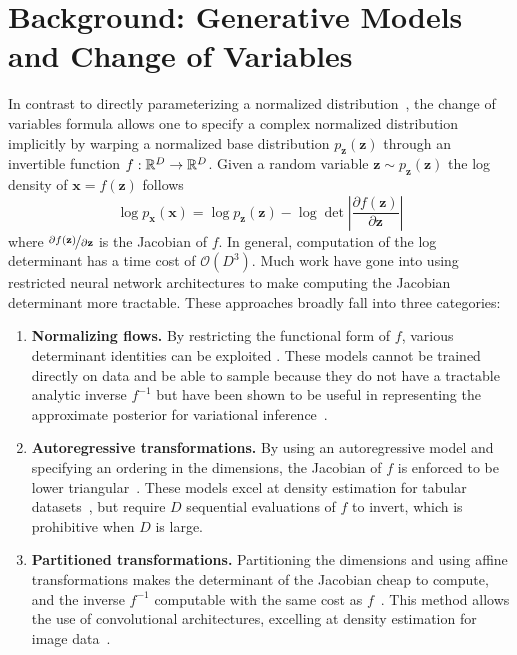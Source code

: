 \documentclass{article} %
\newcommand{\z}{\mathbf{z}}
\newcommand{\x}{\mathbf{x}}
\newcommand\0{\kern-1.2pt\vec{\kern1.2pt 0}}
\newcommand{\bigO}{\mathcal{O}}
\begin{document}
\section{Background: Generative Models and Change of Variables}\label{sec:cov_models}
In contrast to directly parameterizing a normalized distribution~\citep{oord2016pixel,germain2015made}, the change of variables formula allows one to specify a complex normalized distribution implicitly by warping a normalized base distribution $p_\z(\z)$ through an invertible function ${f: \mathbb{R}^D \rightarrow \mathbb{R}^D}$.
Given a random variable $\z \sim p_\z(\z)$ the log density of $\x = f(\z)$ follows
\begin{equation}\label{eq:discrete_cov}
    \log p_\x(\x) = \log p_\z(\z) - \log \det \left| \frac{\partial f(\z)}{\partial \z} \right|
\end{equation}
where $\nicefrac{\partial f(\z)}{\partial \z}$ is the Jacobian of $f$.
In general, computation of the log determinant has a time cost of $\bigO(D^3)$.
Much work have gone into using restricted neural network architectures to make computing the Jacobian determinant more tractable. These approaches broadly fall into three categories:
\begin{enumerate}[\indent {}]
    \item \textbf{Normalizing flows.} By restricting the functional form of $f$, various determinant identities can be exploited \citep{rezende2015variational,berg2018sylvester}.
    These models cannot be trained directly on data and be able to sample because they do not have a tractable analytic inverse $f^{-1}$ but have been shown to be useful in representing the approximate posterior for variational inference~\citep{kingma2013auto}.
    \item \textbf{Autoregressive transformations.} By using an autoregressive model and specifying an ordering in the dimensions, the Jacobian of $f$ is enforced to be lower triangular~\citep{kingma2016improved,oliva2018transformation}.
    These models excel at density estimation for tabular datasets~\citep{papamakarios2017masked}, but require $D$ sequential evaluations of $f$ to invert, which is prohibitive when $D$ is large.
    \item \textbf{Partitioned transformations.} Partitioning the dimensions and using affine transformations makes the determinant of the Jacobian cheap to compute, and the inverse $f^{-1}$  computable with the same cost as $f$~\citep{dinh2014nice,dinh2016density}.
    This method allows the use of convolutional architectures, excelling at density estimation for image data~\citep{dinh2016density,kingma2018glow}.
\end{enumerate}
\end{document}
